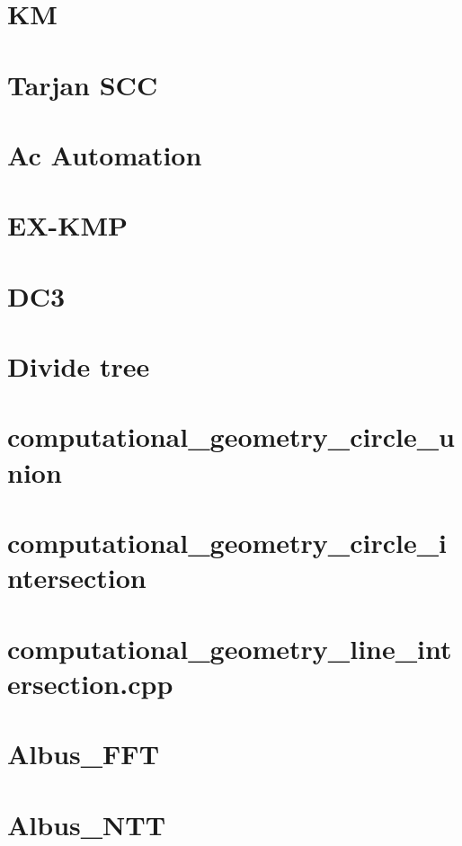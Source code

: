 \documentclass[10pt, a4paper]{article}
\begin{document}
	\section{KM}
	
	\section{Tarjan SCC}
	
	\section{Ac Automation}
	
	\section{EX-KMP}
	
	\section{DC3}
	
	\section{Divide tree}
	
	\section{computational\_geometry\_circle\_union}
	
	\section{computational\_geometry\_circle\_intersection}
	
	\section{computational\_geometry\_line\_intersection.cpp}
	
	\section{Albus\_FFT}
	
	\section{Albus\_NTT}
	
\begin{multicols}{2}


\end{multicols}
\end{document}
